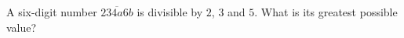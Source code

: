 A six-digit number $\overline{234a6b}$ is divisible by $2$, $3$ and $5$. What is its greatest possible value?
